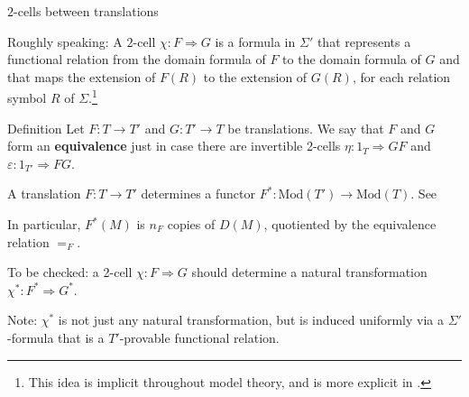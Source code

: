 \documentclass[ignorenonframetext,fleqn]{beamer}
\newcommand{\2}{\mathcal}
\begin{document}
\begin{frame}{$2$-cells between translations}

 \begin{center}
\end{center}

Roughly speaking: A $2$-cell $\chi :F\Rightarrow G$ is a formula in
$\Sigma '$ that represents a functional relation from the domain
formula of $F$ to the domain formula of $G$ and that maps the
extension of $F(R)$ to the extension of $G(R)$, for each relation
symbol $R$ of $\Sigma$.\footnote{This idea is implicit throughout
  model theory, and is more explicit in \citep{visser2006}.}

\end{frame}

\begin{frame}

  \begin{block}{Definition} Let $F:T\to T'$ and $G:T'\to T$ be
    translations. We say that $F$ and $G$ form an \textbf{equivalence}
    just in case there are invertible 2-cells
    $\eta :1_T\Rightarrow GF$ and $\varepsilon :1_{T'}\Rightarrow FG$.
  \end{block}  



\end{frame}

\begin{frame}

  A translation $F:T\to T'$ determines a functor
  $F^*:\mathrm{Mod}(T')\to\mathrm{Mod}(T)$. See
  \citep{gajda,halvorson}

  \vfill In particular, $F^*(M)$ is $n_F$ copies of $D(M)$, quotiented
  by the equivalence relation $=_F$.
  
\end{frame}

\begin{frame}

  To be checked: a 2-cell $\chi :F\Rightarrow G$ should determine a
  natural transformation $\chi ^*:F^*\Rightarrow G^*$.

  \bigskip Note: $\chi ^*$ is not just any natural transformation, but
  is induced uniformly via a $\Sigma '$-formula that is a
  $T'$-provable functional relation.

\end{frame}
\end{document}
